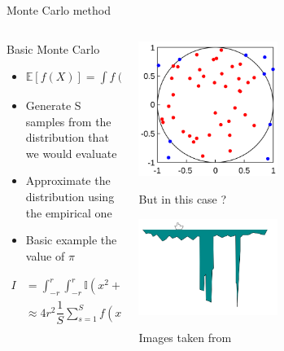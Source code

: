 \documentclass{beamer}
\begin{document}
\begin{frame} {Monte Carlo method \cite{frenkel2001understanding,mackay2003information,murphy2012machine}}
\begin{columns}
\begin{column}{0.5\textwidth}
Basic Monte Carlo
\begin{itemize}
\item $\mathbb{E}[f(X)]=\int f(x)p(x)dx \approx (1/S) \sum^{S}_{s=1} f(x_{S})$
\item Generate S samples from the distribution that we would evaluate 
\item Approximate the distribution using the empirical one 
\item Basic example the value of $\pi$ 
\end{itemize}
\begin{equation}
\begin{split}
I& =\int^{r}_{-r}\int^{r}_{-r} \mathbb{I}(x^{2}+y^{2}\leq r^{2})dx\;dy  \\
& \approx 4r^{2}\dfrac{1}{S}\sum^{S}_{s=1}f(x_{s},y_{s})
\end{split}
\end{equation}
\end{column}
\begin{column}{0.5\textwidth}
 \begin{center}
     \includegraphics[width=0.5\textwidth]{Pic/MonteCarloIntegrationCircle.png}
\end{center}
 \begin{center}
But in this case ?
\end{center}
 \begin{center}
     \includegraphics[width=0.5\textwidth]{Pic/Metropolis.png}
\end{center}
 \begin{center}
Images taken from \cite{PBC,mackay2003information}
\end{center}
\end{column}
\end{columns}
\end{frame}
\end{document}
